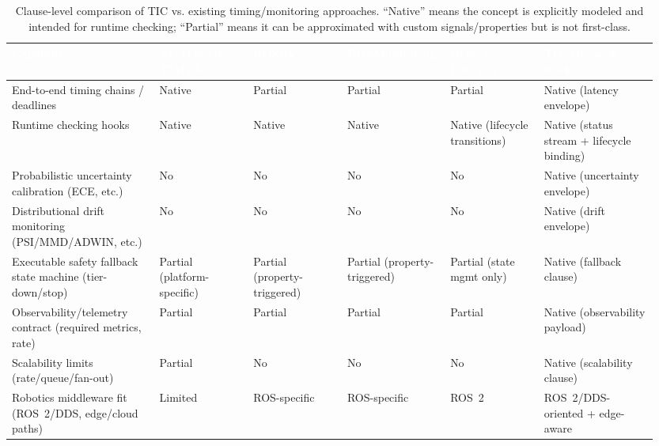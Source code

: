 \documentclass[smallextended]{svjour3}
\begin{document}
\begin{table}[t]
  \centering
  \small
  \setlength{\tabcolsep}{3pt}
  \caption{Clause-level comparison of TIC vs. existing timing/monitoring approaches. ``Native'' means the concept is explicitly modeled and intended for runtime checking; ``Partial'' means it can be approximated with custom signals/properties but is not first-class.}
  \label{tab:tic_comparison}
  \renewcommand{\arraystretch}{1.15}
  \begin{tabular}{@{}L{0.22\linewidth}L{0.14\linewidth}L{0.14\linewidth}L{0.14\linewidth}L{0.14\linewidth}L{0.17\linewidth}@{}}
    \toprule
    \textcolor{white}{\textbf{Capability}} &
    \textcolor{white}{\textbf{AUTOSAR TIMEX}} &
    \textcolor{white}{\textbf{ROSRV}} &
    \textcolor{white}{\textbf{ROS\-Monitoring}} &
    \textcolor{white}{\textbf{ROS~2 Lifecycle}} &
    \textcolor{white}{\textbf{TIC (present work)}} \\
    \midrule
    End-to-end timing chains / deadlines & Native~\cite{autosar2020} & Partial & Partial~\cite{ferrando2020rosmonitoring} & Partial & Native (latency envelope) \\
    Runtime checking hooks              & Native~\cite{autosar2020} & Native~\cite{huang2014rosrv} & Native~\cite{ferrando2020rosmonitoring} & Native (lifecycle transitions) & Native (status stream + lifecycle binding) \\
    Probabilistic uncertainty calibration (ECE, etc.) & No & No & No & No & Native (uncertainty envelope) \\
    Distributional drift monitoring (PSI/MMD/ADWIN, etc.) & No & No & No & No & Native (drift envelope) \\
    Executable safety fallback state machine (tier-down/stop) & Partial (platform-specific) & Partial (property-triggered) & Partial (property-triggered) & Partial (state mgmt only) & Native (fallback clause) \\
    Observability/\allowbreak{}telemetry contract (required metrics, rate) & Partial & Partial & Partial & Partial & Native (observability payload) \\
    Scalability limits (rate/queue/fan-out)             & Partial & No & No & No & Native (scalability clause) \\
    Robotics middleware fit (ROS~2/DDS, edge/cloud paths) & Limited & ROS-specific & ROS-specific & ROS~2 & ROS~2/DDS-oriented + edge-aware \\
    \bottomrule
  \end{tabular}
  \renewcommand{\arraystretch}{1}
\end{table}
\end{document}

